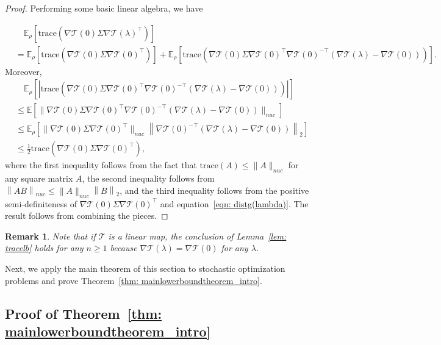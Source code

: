 \documentclass[11pt,twoside]{article}
\numberwithin{equation}{section}
\newcommand{\norm}[1] {\left \| #1 \right \|}
\newcommand{\EE}{\mathbb{E}}
\newcommand{\trace}[1]{\mathrm{trace}\left(#1\right)}
\newcommand{\cT}{\mathcal{T}}
\newcommand{\1}{\mathbf{1}}
\newtheorem{remark}{Remark}
\theoremstyle{remark}
\theoremstyle{plain}
\begin{document}
\begin{proof}

Performing some basic linear algebra, we have

\begin{align*}
	& \quad \EE_\rho \left[\trace{\nabla \cT(0) \Sigma \nabla \cT(\lambda)^\top}\right]\\
	&= \EE_\rho\left[\trace{\nabla \cT(0) \Sigma \nabla \cT(0)^\top}\right] +  \EE_\rho\left[\trace{\nabla \cT(0) \Sigma \nabla \cT(0)^\top \nabla \cT(0)^{-\top} (\nabla \cT(\lambda) - \nabla \cT(0))}\right].
\end{align*}
Moreover, 
\begin{align*}
	&\quad\EE_\rho\left[\left|\trace{\nabla \cT(0) \Sigma \nabla \cT(0)^\top \nabla \cT(0)^{-\top} (\nabla \cT(\lambda) - \nabla \cT(0))}\right|\right]\\
	&\le \EE\left[\|\nabla \cT(0) \Sigma \nabla \cT(0)^\top \nabla \cT(0)^{-\top} (\nabla \cT(\lambda) - \nabla \cT(0)) \|_{nuc}\right]\\
	&\le \EE_\rho\left[\|\nabla \cT(0) \Sigma \nabla \cT(0)^\top\|_{nuc} \norm{\nabla \cT(0)^{-\top} (\nabla \cT(\lambda) - \nabla \cT(0))}_2\right]\\
	&\le \frac{1}{2} \trace{\nabla \cT(0) \Sigma \nabla \cT(0)^\top},
\end{align*}
	where the first inequality follows from the fact that $\trace{A}\le \|A\|_{nuc}$ for any square matrix $A$, the second inequality follows from $\norm{AB}_{nuc} \le \|A\|_{nuc} \norm{B}_2$, and the third inequality follows from the positive semi-definiteness of $\nabla \cT(0) \Sigma \nabla \cT(0)^\top $ and equation~\eqref{eqn: distg(lambda)}. The result follows from combining the pieces.
\end{proof}
\begin{remark}\label{remark: linearcaselemma}
	Note that if $\cT$ is a linear map, the conclusion of Lemma~\ref{lem: tracelb} holds for any $n \ge 1$ because $\nabla \cT(\lambda) = \nabla \cT(0)$ for any $\lambda$.
\end{remark}

Next, we apply the main theorem of this section to stochastic optimization problems and prove Theorem~\ref{thm: mainlowerboundtheorem_intro}.

\subsection{Proof of Theorem~\ref{thm: mainlowerboundtheorem_intro}}\label{sec:lower_bound_proof_stochastic}
\end{document}
